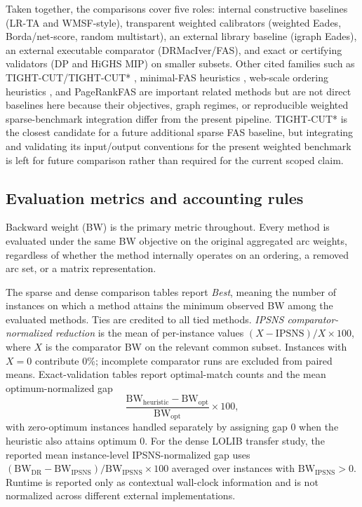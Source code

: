 Taken together, the comparisons cover five roles: internal constructive baselines (LR-TA and WMSF-style), transparent weighted calibrators (weighted Eades, Borda/net-score, random multistart), an external library baseline (igraph Eades), an external executable comparator (DRMacIver/FAS), and exact or certifying validators (DP and HiGHS MIP) on smaller subsets. Other cited families such as TIGHT-CUT/TIGHT-CUT* \cite{HGH21}, minimal-FAS heuristics \cite{CCP23CEUR,CCP24,CC25}, web-scale ordering heuristics \cite{SST16}, and PageRankFAS \cite{GLT23} are important related methods but are not direct baselines here because their objectives, graph regimes, or reproducible weighted sparse-benchmark integration differ from the present pipeline. TIGHT-CUT* is the closest candidate for a future additional sparse FAS baseline, but integrating and validating its input/output conventions for the present weighted benchmark is left for future comparison rather than required for the current scoped claim.

\subsection{Evaluation metrics and accounting rules}

Backward weight (BW) is the primary metric throughout. Every method is evaluated under the same BW objective on the original aggregated arc weights, regardless of whether the method internally operates on an ordering, a removed arc set, or a matrix representation.

The sparse and dense comparison tables report \emph{Best}, meaning the number of instances on which a method attains the minimum observed BW among the evaluated methods. Ties are credited to all tied methods. \emph{IPSNS comparator-normalized reduction} is the mean of per-instance values \((X-\mathrm{IPSNS})/X\times 100\), where \(X\) is the comparator BW on the relevant common subset. Instances with \(X=0\) contribute 0\%; incomplete comparator runs are excluded from paired means. Exact-validation tables report optimal-match counts and the mean optimum-normalized gap
\[
\frac{\mathrm{BW}_{\mathrm{heuristic}}-\mathrm{BW}_{\mathrm{opt}}}{\mathrm{BW}_{\mathrm{opt}}}\times 100,
\]
with zero-optimum instances handled separately by assigning gap 0 when the heuristic also attains optimum 0. For the dense LOLIB transfer study, the reported mean instance-level IPSNS-normalized gap uses \((\mathrm{BW}_{\mathrm{DR}}-\mathrm{BW}_{\mathrm{IPSNS}})/\mathrm{BW}_{\mathrm{IPSNS}}\times 100\) averaged over instances with \(\mathrm{BW}_{\mathrm{IPSNS}}>0\). Runtime is reported only as contextual wall-clock information and is not normalized across different external implementations.

